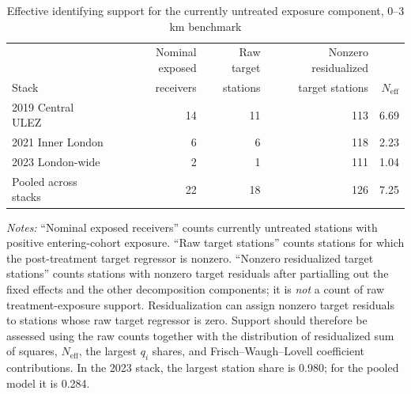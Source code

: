 \begin{table}[!htbp]
\centering
\caption{Effective identifying support for the currently untreated exposure component, 0--3 km benchmark}
\label{tab:ulez_effective_support_3km}
\small
\begin{threeparttable}
\begin{tabular}{lrrrr}
\toprule
 & Nominal exposed & Raw target & Nonzero residualized & \\
Stack & receivers & stations & target stations & $N_{\mathrm{eff}}$ \\
\midrule
2019 Central ULEZ & 14 & 11 & 113 & 6.69 \\
2021 Inner London & 6 & 6 & 118 & 2.23 \\
2023 London-wide & 2 & 1 & 111 & 1.04 \\
\midrule
Pooled across stacks & 22 & 18 & 126 & 7.25 \\
\bottomrule
\end{tabular}
\begin{tablenotes}
\footnotesize
\item \emph{Notes:} ``Nominal exposed receivers'' counts currently untreated stations with positive entering-cohort exposure. ``Raw target stations'' counts stations for which the post-treatment target regressor is nonzero. ``Nonzero residualized target stations'' counts stations with nonzero target residuals after partialling out the fixed effects and the other decomposition components; it is \emph{not} a count of raw treatment-exposure support. Residualization can assign nonzero target residuals to stations whose raw target regressor is zero. Support should therefore be assessed using the raw counts together with the distribution of residualized sum of squares, $N_{\mathrm{eff}}$, the largest $q_i$ shares, and Frisch--Waugh--Lovell coefficient contributions. In the 2023 stack, the largest station share is 0.980; for the pooled model it is 0.284.
\end{tablenotes}
\end{threeparttable}
\end{table}
